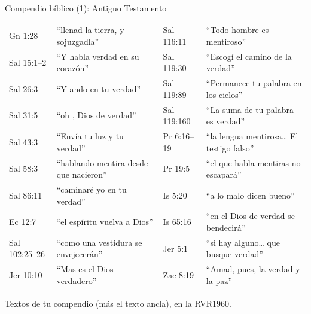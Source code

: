 \begin{frame}{Compendio bíblico (1): Antiguo Testamento}
\fontsize{6.2}{7.4}\selectfont\renewcommand{\arraystretch}{1.08}
\begin{tabular}{@{}>{\RaggedRight\arraybackslash}p{1.6cm}>{\RaggedRight\arraybackslash}p{4.3cm}|>{\RaggedRight\arraybackslash}p{1.6cm}>{\RaggedRight\arraybackslash}p{4.3cm}@{}}
\toprule
Gn 1:28 & ``llenad la tierra, y sojuzgadla'' & Sal 116:11 & ``Todo hombre es mentiroso'' \\
Sal 15:1--2 & ``Y habla verdad en su corazón'' & Sal 119:30 & ``Escogí el camino de la verdad'' \\
Sal 26:3 & ``Y ando en tu verdad'' & Sal 119:89 & ``Permanece tu palabra en los cielos'' \\
Sal 31:5 & ``oh \SENOR{}, Dios de verdad'' & Sal 119:160 & ``La suma de tu palabra es verdad'' \\
Sal 43:3 & ``Envía tu luz y tu verdad'' & Pr 6:16--19 & ``la lengua mentirosa\ldots{} El testigo falso'' \\
Sal 58:3 & ``hablando mentira desde que nacieron'' & Pr 19:5 & ``el que habla mentiras no escapará'' \\
Sal 86:11 & ``caminaré yo en tu verdad'' & Is 5:20 & ``a lo malo dicen bueno'' \\
Ec 12:7 & ``el espíritu vuelva a Dios'' & Is 65:16 & ``en el Dios de verdad se bendecirá'' \\
Sal 102:25--26 & ``como una vestidura se envejecerán'' & Jer 5:1 & ``si hay alguno\ldots{} que busque verdad'' \\
Jer 10:10 & ``Mas \SENOR{} es el Dios verdadero'' & Zac 8:19 & ``Amad, pues, la verdad y la paz'' \\
\bottomrule
\end{tabular}\par\smallskip
{\tiny\color{gris}Textos de tu compendio (más el texto ancla), en la RVR1960.}
\end{frame}

